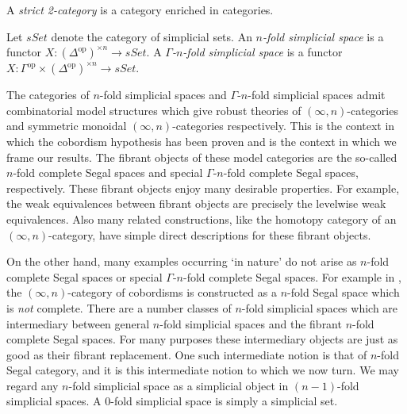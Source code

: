 \documentclass{amsart}
\begin{document}
\begin{example}
	A {\em strict 2-category} is a category enriched in categories.
\end{example}

\begin{definition}
	Let $sSet$ denote the category of simplicial sets. An {\em $n$-fold simplicial space} is a functor $X: (\Delta^\textrm{op})^{\times n} \to sSet$. A {\em $\Gamma$-$n$-fold simplicial space} is a functor $X: \Gamma^\textrm{op} \times (\Delta^\textrm{op})^{\times n} \to sSet$.
\end{definition}

The categories of $n$-fold simplicial spaces and $\Gamma$-$n$-fold simplicial spaces admit combinatorial model structures which give robust theories of $(\infty, n)$-categories and symmetric monoidal $(\infty, n)$-categories respectively. This is the context in which the cobordism hypothesis has been proven and is the context in which we frame our results. The fibrant objects of these model categories are the so-called $n$-fold complete Segal spaces and special $\Gamma$-$n$-fold complete Segal spaces, respectively. These fibrant objects enjoy many desirable properties. For example, the weak equivalences between fibrant objects are precisely the levelwise weak equivalences. Also many related constructions, like the homotopy category of an $(\infty, n)$-category, have simple direct descriptions for these fibrant objects. 

On the other hand, many examples occurring `in nature' do not arise as $n$-fold complete Segal spaces or special $\Gamma$-$n$-fold complete Segal spaces. For example in \cite{Lurie}, the $(\infty, n)$-category of cobordisms is constructed as a $n$-fold Segal space which is {\em not} complete. There are a number classes of $n$-fold simplicial spaces which are intermediary between general $n$-fold simplicial spaces and the fibrant $n$-fold complete Segal spaces. For many purposes these intermediary objects are just as good as their fibrant replacement. One such intermediate notion is that of $n$-fold Segal category, and it is this intermediate notion to which we now turn. 
%
We may regard any $n$-fold simplicial space as a simplicial object in $(n-1)$-fold simplicial spaces. A $0$-fold simplicial space is simply a simplicial set. 
\end{document}
